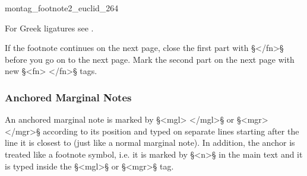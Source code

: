 \vspace{2mm}
\begin{sampleImage}{montag_footnote2_euclid_264}
\end{sampleImage}

\begin{crossref}
For Greek ligatures see .
\end{crossref}

\begin{note}
If the footnote continues on the next page, close the first part with §</fn>§ before you go on to the next page. Mark the second part on the next page with new §<fn> </fn>§ tags.
\end{note}


\subsubsection{Anchored Marginal Notes}
\label{section anchored marginal notes}

\begin{mainruleLessImportant}
An anchored marginal note is marked by §<mgl> </mgl>§ or §<mgr> </mgr>§ according to its position and typed on separate lines starting after the line it is closest to (just like a normal marginal note). In addition, the anchor is treated like a footnote symbol, i.e. it is marked by §<n>§ in the main text and it is typed inside the §<mgl>§ or §<mgr>§ tag.
\end{mainruleLessImportant}

